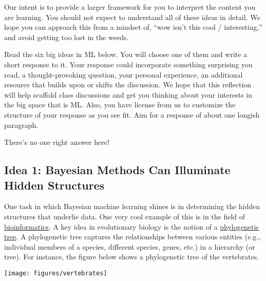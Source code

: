 \documentclass[assignment01_Solutions]{subfiles}
\begin{document}
\begin{notice}
Our intent is to provide a larger framework for you to interpret the content you are learning.  You should not expect to understand all of these ideas in detail.  We hope you can approach this from a mindset of, ``wow isn't this cool / interesting,'' and avoid getting too lost in the weeds.
\end{notice}


\begin{exercise}
Read the six big ideas in ML below.  You will choose one of them and write a short response to it.  Your response could incorporate something surprising you read, a thought-provoking question, your personal experience, an additional resource that builds upon or shifts the discussion.  We hope that this reflection will help scaffold class discussions and get you thinking about your interests in the big space that is ML.  Also, you have license from us to customize the structure of your response as you see fit.  Aim for a response of about one longish paragraph.

\begin{boxedsolution}
There's no one right answer here!
\end{boxedsolution}
\end{exercise}


\subsection*{Idea 1: Bayesian Methods Can Illuminate Hidden Structures}

One task in which Bayesian machine learning shines is in determining the hidden structures that underlie data.  One very cool example of this is in the field of \href{https://en.wikipedia.org/wiki/Bioinformatics}{bioinformatics}.  A key idea in evolutionary biology is the notion of a \href{https://en.wikipedia.org/wiki/Phylogenetic_tree}{phylogenetic tree}.  A phylogenetic tree captures the relationships between various entities (e.g., individual members of a species, different species, genes, etc.) in a hierarchy (or tree).  For instance, the figure below shows a phylogenetic tree of the vertebrates.

\begin{center}
\texttt{[image: figures/vertebrates]}
\end{center}
\end{document}
